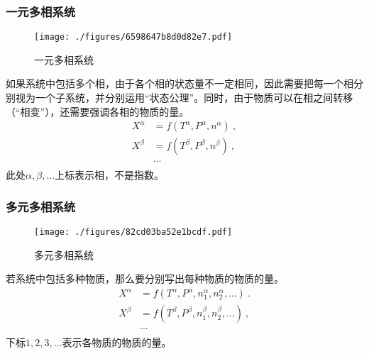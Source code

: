 \subsubsection{一元多相系统}
\begin{figure}[ht]
\centering
\texttt{[image: ./figures/6598647b8d0d82e7.pdf]}
\caption{一元多相系统} \label{fig_statef_2}
\end{figure}
如果系统中包括多个相，由于各个相的状态量不一定相同，因此需要把每一个相分别视为一个子系统，并分别运用“状态公理”。同时，由于物质可以在相之间转移（“相变”），还需要强调各相的物质的量。
$$
\begin{aligned}
X^\alpha&=f(T^\alpha,P^\alpha,n^\alpha)~,\\
X^\beta&=f(T^\beta,P^\beta,n^\beta)~,\\
&...\\
\end{aligned}
$$
此处$\alpha, \beta, ...$上标表示相，不是指数。

\subsubsection{多元多相系统}
\begin{figure}[ht]
\centering
\texttt{[image: ./figures/82cd03ba52e1bcdf.pdf]}
\caption{多元多相系统} \label{fig_statef_3}
\end{figure}
若系统中包括多种物质，那么要分别写出每种物质的物质的量。
$$
\begin{aligned}
X^\alpha&=f(T^\alpha,P^\alpha,n_1^\alpha, n_2^\alpha, ...)~.\\
X^\beta&=f(T^\beta,P^\beta,n_1^\beta, n_2^\beta, ...)~,\\
&...\\
\end{aligned}
$$
下标$1,2,3,...$表示各物质的物质的量。
